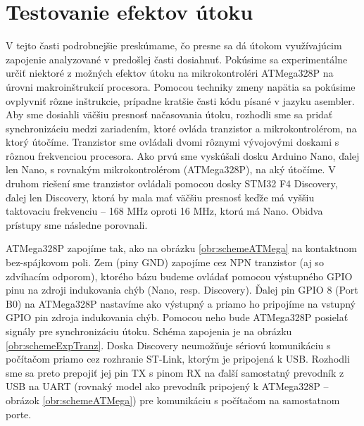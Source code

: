 \section{Testovanie efektov útoku}
V tejto časti podrobnejšie preskúmame, čo presne sa dá útokom využívajúcim zapojenie analyzované v predošlej časti dosiahnuť. Pokúsime sa experimentálne určiť niektoré z možných efektov útoku na mikrokontroléri ATMega328P na úrovni makroinštrukcií procesora. Pomocou techniky zmeny napätia sa pokúsime ovplyvniť rôzne inštrukcie, prípadne kratšie časti kódu písané v jazyku asembler. Aby sme dosiahli väčšiu presnosť načasovania útoku, rozhodli sme sa pridať synchronizáciu medzi zariadením, ktoré ovláda tranzistor a mikrokontrolérom, na ktorý útočíme. Tranzistor sme ovládali dvomi rôznymi vývojovými doskami s rôznou frekvenciou procesora. Ako prvú sme vyskúšali dosku Arduino Nano, ďalej len Nano, s rovnakým mikrokontrolérom (ATMega328P), na aký útočíme. V druhom riešení sme tranzistor ovládali pomocou dosky STM32 F4 Discovery, ďalej len Discovery, ktorá by mala mať väčšiu presnosť keďže má vyššiu taktovaciu frekvenciu -- 168 MHz oproti 16 MHz, ktorú má Nano. Obidva prístupy sme následne porovnali.

ATMega328P zapojíme tak, ako na obrázku \ref{obr:schemeATMega} na kontaktnom bez-spájkovom poli. Zem (piny GND) zapojíme cez NPN tranzistor (aj so zdvíhacím odporom), ktorého bázu budeme ovládať pomocou výstupného GPIO pinu na zdroji indukovania chýb (Nano, resp. Discovery). Ďalej pin GPIO 8 (Port B0) na ATMega328P nastavíme ako výstupný a priamo ho pripojíme na vstupný GPIO pin zdroja indukovania chýb. Pomocou neho bude ATMega328P posielať signály pre synchronizáciu útoku. Schéma zapojenia je na obrázku \ref{obr:schemeExpTranz}. Doska Discovery neumožňuje sériovú komunikáciu s počítačom priamo cez rozhranie ST-Link, ktorým je pripojená k USB. Rozhodli sme sa preto prepojiť jej pin TX s pinom RX na ďalší samostatný prevodník z USB na UART (rovnaký model ako prevodník pripojený k ATMega328P -- obrázok \ref{obr:schemeATMega}) pre komunikáciu s počítačom na samostatnom porte.

